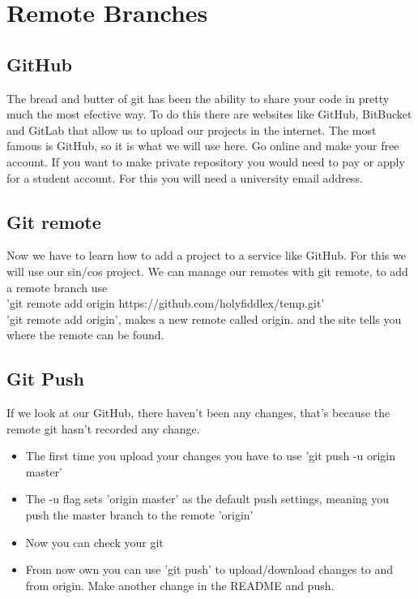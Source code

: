 \documentclass{beamer}
\begin{document}
\section{Remote Branches}
\subsection{GitHub}
\begin{frame}
The bread and butter of git has been the ability to share your code in pretty 
much the most efective way.
\newline
\newline
To do this there are websites like GitHub, BitBucket and GitLab that allow us 
to upload our projects in the internet. The most famous is GitHub, so it is 
what we will use here.
\newline
\newline
Go online and make your free account. If you want to make private 
repository you would need to pay or apply for a student account. For this you 
will need a university email address.
\end{frame}

\subsection{Git remote}
\begin{frame}
 Now we have to learn how to add a project to a service like GitHub. For this we will use our sin/cos project.
 We can manage our remotes with git remote, to add a remote branch use \\
 'git remote add origin https://github.com/holyfiddlex/temp.git'\\
 'git remote add origin', makes a new remote called origin. and the site tells you where the remote can be found.
\end{frame}

\subsection{Git Push}
\begin{frame}
If we look at our GitHub, there haven't been any changes, that's because the remote git hasn't recorded any change.\\
\begin{itemize}
 \item The first time you upload your changes you have to use 'git push -u origin master'
 \item The -u flag sets 'origin master' as the default push settings, meaning you push the master branch to the remote 'origin'
 \item Now you can check your git 
 \item From now own you can use 'git push' to upload/download changes to and from origin. Make another change in the README and push.
\end{itemize}
\end{frame}
\end{document}
